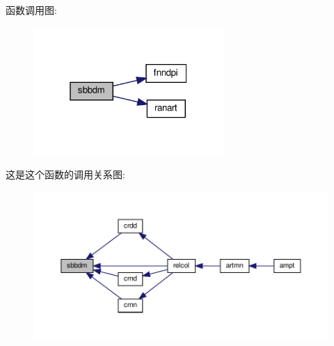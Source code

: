 函数调用图\+:
\nopagebreak
\begin{figure}[H]
\begin{center}
\leavevmode
\includegraphics[width=205pt]{sbbdm_8f90_a75b3c8e9abcb89a5eb3c6e35be6f0f33_cgraph}
\end{center}
\end{figure}
这是这个函数的调用关系图\+:
\nopagebreak
\begin{figure}[H]
\begin{center}
\leavevmode
\includegraphics[width=350pt]{sbbdm_8f90_a75b3c8e9abcb89a5eb3c6e35be6f0f33_icgraph}
\end{center}
\end{figure}
